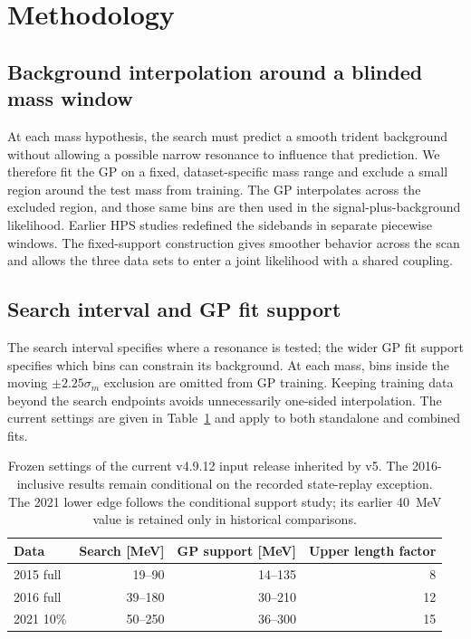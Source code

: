 \section{Methodology}
\label{sec:methodology}

\subsection{Background interpolation around a blinded mass window}

At each mass hypothesis, the search must predict a smooth trident background without
allowing a possible narrow resonance to influence that prediction. We therefore fit the
GP on a fixed, dataset-specific mass range and exclude a small region around the test
mass from training. The GP interpolates across the excluded region, and those same bins
are then used in the signal-plus-background likelihood. Earlier HPS studies redefined
the sidebands in separate piecewise windows. The fixed-support construction gives
smoother behavior across the scan and allows the three data sets to enter a joint
likelihood with a shared coupling.

\subsection{Search interval and GP fit support}
\label{sec:fit-support-policy}

The search interval specifies where a resonance is tested; the wider GP fit
support specifies which bins can constrain its background. At each mass, bins
inside the moving $\pm2.25\sigma_m$ exclusion are omitted from GP training.
Keeping training data beyond the search endpoints avoids unnecessarily
one-sided interpolation. The current settings are given in
Table~\ref{tab:v4p9-card-lineage} and apply to both standalone and combined fits.

\begin{table}[htbp]
\centering
\begin{tabular}{lrrr}
\toprule
Data & Search [MeV] & GP support [MeV] & Upper length factor \\
\midrule
2015 full & 19--90 & 14--135 & 8 \\
2016 full & 39--180 & 30--210 & 12 \\
2021 10\% & 50--250 & 36--300 & 15 \\
\bottomrule
\end{tabular}
\caption{Frozen settings of the current v4.9.12 input release inherited by v5.
The 2016-inclusive results remain conditional on the recorded state-replay
exception. The 2021 lower edge follows the conditional support study;
its earlier 40~MeV value is retained only in historical comparisons.}
\label{tab:v4p9-card-lineage}
\end{table}

